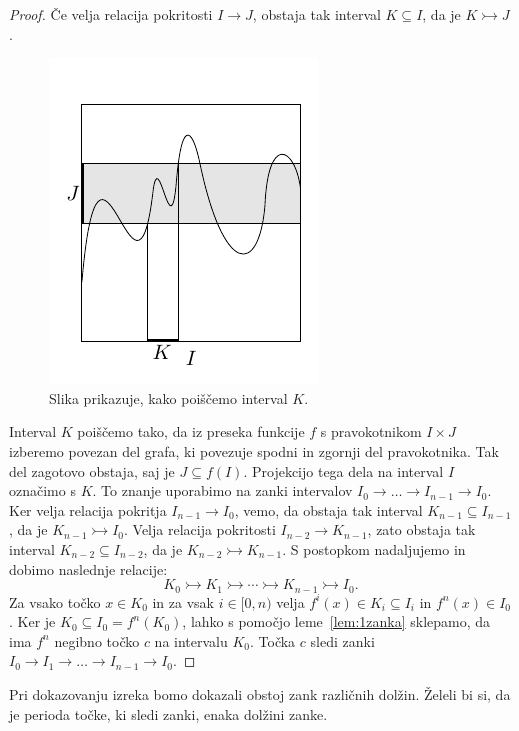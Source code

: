 \documentclass[mat2]{fmfdelo}
\begin{document}
\begin{proof}
Če velja relacija pokritosti $I \to J$, obstaja tak interval $K \subseteq I$, da je $K \rightarrowtail J$.
\begin{figure}[h]
  \centering
  \includegraphics[]{images/bezje.pdf}
  \caption[Primer vektorske slike.]{Slika prikazuje, kako poiščemo interval $K$.}
  \label{fig:bezje}
\end{figure}
Interval $K$ poiščemo tako, da iz preseka funkcije $f$ s pravokotnikom $I \times J$ izberemo povezan del grafa, ki povezuje spodni in zgornji del pravokotnika. Tak del zagotovo obstaja, saj je $J \subseteq f(I)$. Projekcijo tega dela na interval $I$ označimo s $K$. To znanje uporabimo na zanki intervalov $I_0 \to \dots \to I_{n-1} \to I_0$. Ker velja relacija pokritja $I_{n-1} \to I_0$, vemo, da obstaja tak interval $K_{n-1} \subseteq I_{n-1}$, da je $K_{n-1} \rightarrowtail I_0$. Velja relacija pokritosti $I_{n-2} \to K_{n-1}$, zato obstaja tak interval $K_{n-2} \subseteq I_{n-2}$, da je $K_{n-2} \rightarrowtail K_{n-1}$. S postopkom nadaljujemo in dobimo naslednje relacije:
$$K_0 \rightarrowtail K_1 \rightarrowtail \cdots \rightarrowtail K_{n-1} \rightarrowtail I_0.$$
Za vsako točko $x \in K_0$ in za vsak $i \in [0, n)$ velja $f^i(x) \in K_i \subseteq I_i$ in $f^n(x) \in I_0$. Ker je $K_0 \subseteq I_0 = f^n(K_0)$, lahko s pomočjo leme~\ref{lem:1zanka} sklepamo, da ima $f^n$ negibno točko $c$ na intervalu $K_0$. Točka $c$ sledi zanki $I_0 \to I_1 \to \dots \to I_{n-1} \to I_0$.
\end{proof}

Pri dokazovanju izreka bomo dokazali obstoj zank različnih dolžin. Želeli bi si, da je perioda točke, ki sledi zanki, enaka dolžini zanke. 
\end{document}

